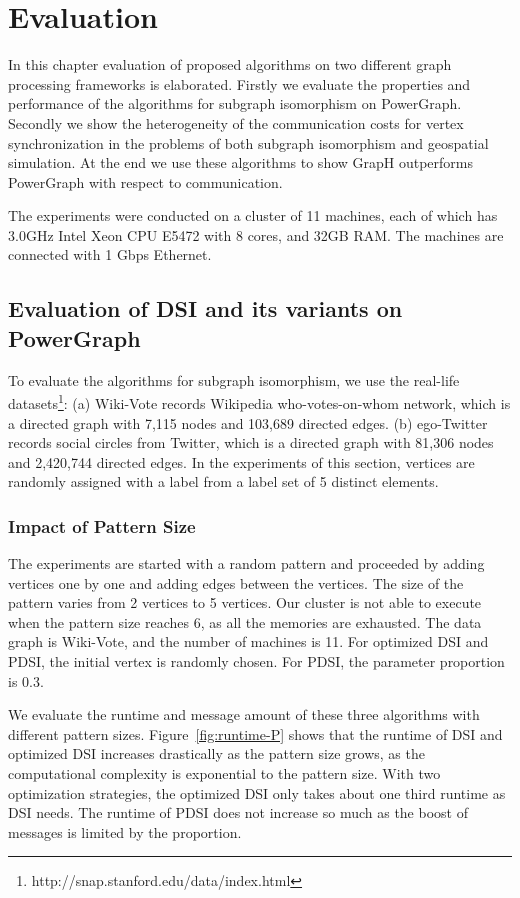 \chapter{Evaluation}
\label{chap:c5}

In this chapter evaluation of proposed algorithms on two different graph processing frameworks is elaborated. Firstly we evaluate the properties and performance of the algorithms for subgraph isomorphism on PowerGraph. Secondly we show the heterogeneity of the communication costs for vertex synchronization in the problems of both subgraph isomorphism and geospatial simulation. At the end we use these algorithms to show GrapH outperforms PowerGraph with respect to communication.

The experiments were conducted on a cluster of 11 machines, each of which has 3.0GHz Intel Xeon CPU E5472 with 8 cores, and 32GB RAM. The machines are connected with 1 Gbps Ethernet.

\section{Evaluation of DSI and its variants on PowerGraph}

To evaluate the algorithms for subgraph isomorphism, we use the real-life datasets\footnote{http://snap.stanford.edu/data/index.html}: (a) Wiki-Vote records Wikipedia who-votes-on-whom network, which is a directed graph with 7,115 nodes and 103,689 directed edges. (b) ego-Twitter records social circles from Twitter, which is a directed graph with 81,306 nodes and 2,420,744 directed edges. In the experiments of this section, vertices are randomly assigned with a label from a label set of 5 distinct elements.

\subsection{Impact of Pattern Size}

The experiments are started with a random pattern and proceeded by adding vertices one by one and adding edges between the vertices. The size of the pattern varies from 2 vertices to 5 vertices. Our cluster is not able to execute when the pattern size reaches 6, as all the memories are exhausted. The data graph is Wiki-Vote, and the number of machines is 11. For optimized DSI and PDSI, the initial vertex is randomly chosen. For PDSI, the parameter proportion is 0.3. 

We evaluate the runtime and message amount of these three algorithms with different pattern sizes. Figure~\ref{fig:runtime-P} shows that the runtime of DSI and optimized DSI increases drastically as the pattern size grows, as the computational complexity is exponential to the pattern size. With two optimization strategies, the optimized DSI only takes about one third runtime as DSI needs. The runtime of PDSI does not increase so much as the boost of messages is limited by the proportion.

